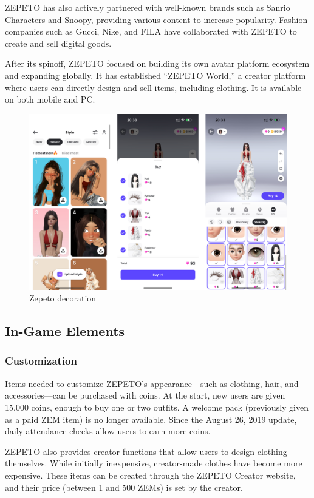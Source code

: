 ZEPETO has also actively partnered with well-known brands such as Sanrio Characters and Snoopy, providing various content to increase popularity. Fashion companies such as Gucci, Nike, and FILA have collaborated with ZEPETO to create and sell digital goods.  

After its spinoff, ZEPETO focused on building its own avatar platform ecosystem and expanding globally. It has established “ZEPETO World,” a creator platform where users can directly design and sell items, including clothing. It is available on both mobile and PC.  

\begin{figure}
    \centering
    \includegraphics[width=0.7\linewidth]{template/images/chap4/zepeto_deco.png}
    \caption{Zepeto decoration}
    \label{fig:placeholder}
\end{figure}

\subsection{In-Game Elements}
\subsubsection{Customization}
Items needed to customize ZEPETO’s appearance—such as clothing, hair, and accessories—can be purchased with coins. At the start, new users are given 15,000 coins, enough to buy one or two outfits. A welcome pack (previously given as a paid ZEM item) is no longer available. Since the August 26, 2019 update, daily attendance checks allow users to earn more coins.  

ZEPETO also provides creator functions that allow users to design clothing themselves. While initially inexpensive, creator-made clothes have become more expensive. These items can be created through the ZEPETO Creator website, and their price (between 1 and 500 ZEMs) is set by the creator.  

